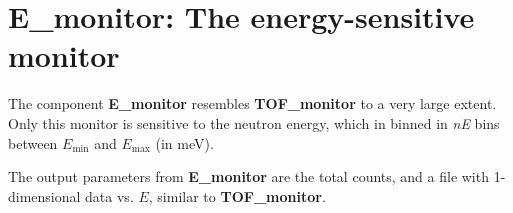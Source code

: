 \section{E\_monitor: The energy-sensitive monitor} \label{s:E_monitor}

The component \textbf{E\_monitor} resembles \textbf{TOF\_monitor}
to a very large extent. Only this monitor is sensitive to
the neutron energy, which in binned in \textit{nE} bins between
$E_\textrm{min}$ and $E_\textrm{max}$ (in meV).

The output parameters from \textbf{E\_monitor} are the total counts,
and a file with 1-dimensional data vs. $E$, similar to \textbf{TOF\_monitor}.


